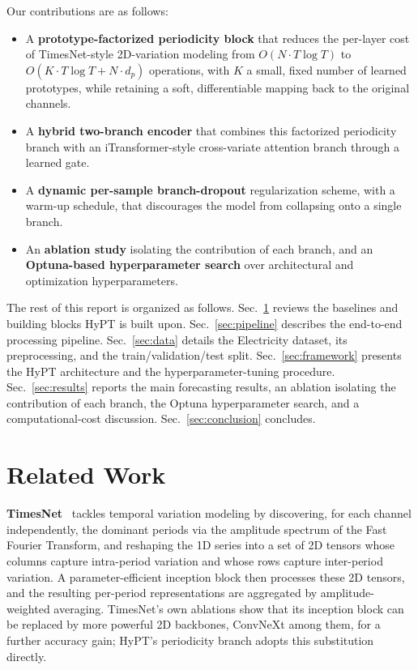 \documentclass[10pt,journal]{IEEEtran}
\newcommand{\secref}[1]{Sec.~\ref{#1}}
\begin{document}
Our contributions are as follows:
\begin{itemize}
\item A \textbf{prototype-factorized periodicity block} that reduces the per-layer cost of TimesNet-style 2D-variation modeling from $O(N \cdot T \log T)$ to $O(K \cdot T \log T + N \cdot d_p)$ operations, with $K$ a small, fixed number of learned prototypes, while retaining a soft, differentiable mapping back to the original channels.
\item A \textbf{hybrid two-branch encoder} that combines this factorized periodicity branch with an iTransformer-style cross-variate attention branch through a learned gate.
\item A \textbf{dynamic per-sample branch-dropout} regularization scheme, with a warm-up schedule, that discourages the model from collapsing onto a single branch.
\item An \textbf{ablation study} isolating the contribution of each branch, and an \textbf{Optuna-based hyperparameter search} over architectural and optimization hyperparameters.
\end{itemize}

The rest of this report is organized as follows. \secref{sec:related} reviews the baselines and building blocks HyPT is built upon. \secref{sec:pipeline} describes the end-to-end processing pipeline. \secref{sec:data} details the Electricity dataset, its preprocessing, and the train/validation/test split. \secref{sec:framework} presents the HyPT architecture and the hyperparameter-tuning procedure. \secref{sec:results} reports the main forecasting results, an ablation isolating the contribution of each branch, the Optuna hyperparameter search, and a computational-cost discussion. \secref{sec:conclusion} concludes.

\section{Related Work}
\label{sec:related}

\textbf{TimesNet}~\cite{timesnet} tackles temporal variation modeling by discovering, for each channel independently, the dominant periods via the amplitude spectrum of the Fast Fourier Transform, and reshaping the 1D series into a set of 2D tensors whose columns capture intra-period variation and whose rows capture inter-period variation. A parameter-efficient inception block then processes these 2D tensors, and the resulting per-period representations are aggregated by amplitude-weighted averaging. TimesNet's own ablations show that its inception block can be replaced by more powerful 2D backbones, ConvNeXt among them, for a further accuracy gain; HyPT's periodicity branch adopts this substitution directly.
\end{document}
